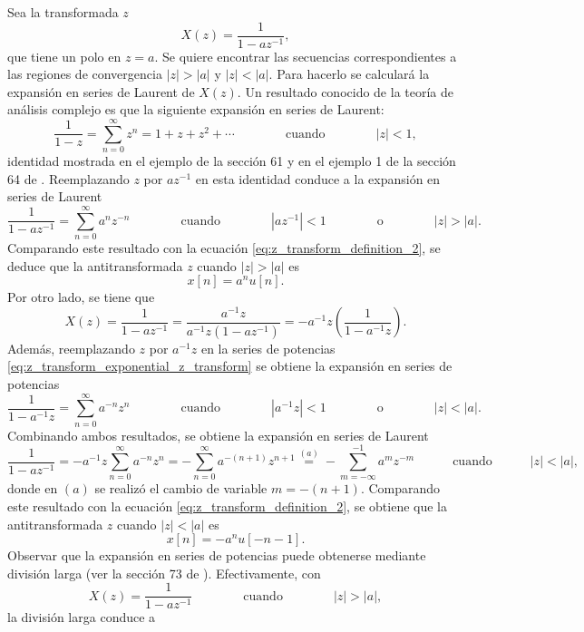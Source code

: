 \documentclass[a4paper]{report}
\begin{document}
Sea la transformada \(z\)
\[
 X(z)=\frac{1}{1-az^{-1}},
\]
que tiene un polo en \(z=a\). Se quiere encontrar las secuencias correspondientes a las regiones de convergencia
\(|z|>|a|\) y \(|z|<|a|\). Para hacerlo se calculará la expansión en series de Laurent de \(X(z)\). Un resultado conocido de la teoría de análisis complejo es que la siguiente expansión en series de Laurent:
\begin{equation}\label{eq:z_transform_exponential_z_transform}
 \frac{1}{1-z}=\sum_{n=0}^\infty z^n=1+z+z^2+\cdots
 \qquad\qquad\textrm{cuando}\qquad\qquad
 |z|<1, 
\end{equation}
identidad mostrada en el ejemplo de la sección 61 y en el ejemplo 1 de la sección 64 de \cite{brown2013complex}. Reemplazando \(z\) por \(az^{-1}\) en esta identidad conduce a la expansión en series de Laurent
\[
 \frac{1}{1-az^{-1}}=\sum_{n=0}^\infty a^nz^{-n}
 \qquad\qquad\textrm{cuando}\qquad\qquad
 |az^{-1}|<1
 \qquad\qquad\textrm{o}\qquad\qquad
 |z|>|a|.
\]
Comparando este resultado con la ecuación \ref{eq:z_transform_definition_2}, se deduce que la antitransformada \(z\) cuando \(|z|>|a|\) es
\[
 x[n]=a^nu[n].
\]
Por otro lado, se tiene que
\begin{equation}\label{eq:z_transform_exponential_anticausal}
 X(z)=\frac{1}{1-az^{-1}}=\frac{a^{-1}z}{a^{-1}z(1-az^{-1})}=-a^{-1}z\left(\frac{1}{1-a^{-1}z}\right). 
\end{equation}
Además, reemplazando \(z\) por \(a^{-1}z\) en la series de potencias \ref{eq:z_transform_exponential_z_transform} se obtiene la expansión en series de potencias
\[
 \frac{1}{1-a^{-1}z}=\sum_{n=0}^\infty a^{-n}z^n
 \qquad\qquad\textrm{cuando}\qquad\qquad
 |a^{-1}z|<1
 \qquad\qquad\textrm{o}\qquad\qquad
 |z|<|a|.
\]
Combinando ambos resultados, se obtiene la expansión en series de Laurent
\[
 \frac{1}{1-az^{-1}}=-a^{-1}z\sum_{n=0}^\infty a^{-n}z^n=-\sum_{n=0}^\infty a^{-(n+1)}z^{n+1}
  \overset{(a)}{=}-\sum_{m=-\infty}^{-1} a^mz^{-m}
  \quad\qquad\textrm{cuando}\quad\qquad
  |z|<|a|,
\]
donde en \((a)\) se realizó el cambio de variable \(m=-(n+1)\). Comparando este resultado con la ecuación \ref{eq:z_transform_definition_2}, se obtiene que la antitransformada \(z\) cuando \(|z|<|a|\) es
\[
 x[n]=-a^nu[-n-1].
\]
Observar que la expansión en series de potencias puede obtenerse mediante división larga (ver la sección 73 de \cite{brown2013complex}). Efectivamente, con 
\[
 X(z)=\frac{1}{1-az^{-1}}
 \qquad\qquad\textrm{cuando}\qquad\qquad
 |z|>|a|,
\]
la división larga conduce a  
\end{document}
